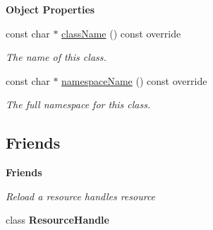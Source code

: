 \begin{Indent}\textbf{ Object Properties}\par
\begin{DoxyCompactItemize}
\item 
const char $\ast$ \mbox{\hyperlink{classrev_1_1_resource_cache_ac6abc543146d0f487cfffb79d33d35e0}{class\+Name}} () const override
\begin{DoxyCompactList}\small\item\em The name of this class. \end{DoxyCompactList}\item 
const char $\ast$ \mbox{\hyperlink{classrev_1_1_resource_cache_a4ed6a3f7ea5e8ea20287a5bce1fa05b9}{namespace\+Name}} () const override
\begin{DoxyCompactList}\small\item\em The full namespace for this class. \end{DoxyCompactList}\end{DoxyCompactItemize}
\end{Indent}
\subsection*{Friends}
\begin{Indent}\textbf{ Friends}\par
{\em Reload a resource handle\textquotesingle{}s resource }\begin{DoxyCompactItemize}
\item 
\mbox{\label{classrev_1_1_resource_cache_a057b608b4c5af1ff11a81128f106fa9a}} 
class {\bfseries Resource\+Handle}
\end{DoxyCompactItemize}
\end{Indent}

